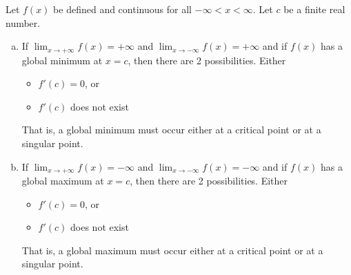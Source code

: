 \begin{theorem}\label{thm:maxMinOnR}
Let $f(x)$ be defined and continuous for all $-\infty<x<\infty$. Let $c$ be a finite
real number.

\begin{enumerate}[(a)]
\item If $\displaystyle \lim_{x\rightarrow+\infty} f(x)=+\infty$ and
$\displaystyle \lim_{x\rightarrow-\infty} f(x)=+\infty$ and if $f(x)$ has a global
minimum at $x = c$, then there are 2 possibilities. Either
  \begin{itemize}
  \item  $f'(c) = 0$, or
  \item  $f'(c)$ does not exist
  \end{itemize}
That is, a global minimum must occur either at a critical point or at a singular point.

\item If $\displaystyle \lim_{x\rightarrow+\infty} f(x)=-\infty$ and
$\displaystyle \lim_{x\rightarrow-\infty} f(x)=-\infty$ and if $f(x)$ has a global
maximum at $x = c$, then there are 2 possibilities. Either
\begin{itemize}
  \item  $f'(c) = 0$, or
  \item  $f'(c)$ does not exist
\end{itemize}
That is, a global maximum must occur either at a critical point or at a singular point.
\end{enumerate}
\end{theorem}



